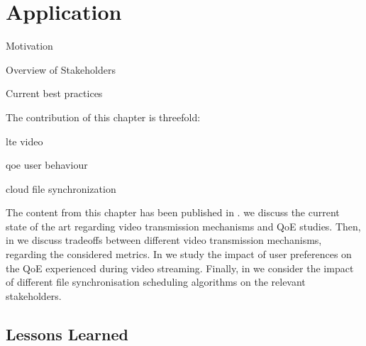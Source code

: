 \chapter{Application}\label{chap:application}

\newcommand{\download}{Download\xspace}
\newcommand{\live}{Live\xspace}
\newcommand{\serviceprovisioning}{Provisioning\xspace}
\newcommand{\streaming}{Streaming\xspace}

Motivation

Overview of Stakeholders

Current best practices

The contribution of this chapter is threefold:
\begin{enumerate*}
\item lte video
\item qoe user behaviour
\item cloud file synchronization
\end{enumerate*}

The content from this chapter has been published in \cite{Schwartz2013b, Hossfeld2015, Schwartz2014a}.
 we discuss the current state of the art regarding video transmission mechanisms and \gls{QoE} studies.
Then, in  we discuss tradeoffs between different video transmission mechanisms, regarding the considered metrics.
In  we study the impact of user preferences on the \gls{QoE} experienced during video streaming.
Finally, in  we consider the impact of different file synchronisation scheduling algorithms on the relevant stakeholders.






\section{Lessons Learned}
